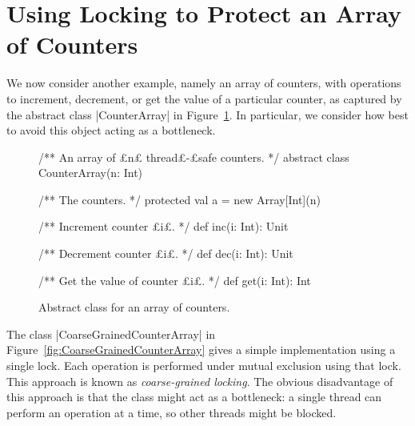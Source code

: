 \section{Using Locking to Protect an Array of Counters}

We now consider another example, namely an array of counters, with operations
to increment, decrement, or get the value of a particular counter, as captured
by the abstract class |CounterArray| in Figure~\ref{fig:CounterArray}.  In
particular, we consider how best to avoid this object acting as a bottleneck.


\begin{figure}[bhtp]
\begin{scala}
/** An array of £n£ thread£-£safe counters. */
abstract class CounterArray(n: Int){
  /** The counters. */
  protected val a = new Array[Int](n)

  /** Increment counter £i£. */
  def inc(i: Int): Unit

  /** Decrement counter £i£. */
  def dec(i: Int): Unit

  /** Get the value of counter £i£. */
  def get(i: Int): Int
}
\end{scala}
\caption{Abstract class for an array of counters.}
\label{fig:CounterArray}
\end{figure}


The class |CoarseGrainedCounterArray| in
Figure~\ref{fig:CoarseGrainedCounterArray} gives a simple implementation using
a single lock.  Each operation is performed under mutual exclusion using that
lock.  This approach is known as \emph{coarse-grained locking}.  The obvious
disadvantage of this approach is that the class might act as a bottleneck: a
single thread can perform an operation at a time, so other threads might be
blocked.


